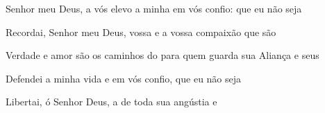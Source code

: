 \begin{greenumerate}
  \item {}Senhor meu Deus, a vós elevo a minha  em vós confio: que eu não seja 

  \item {}Recordai, Senhor meu Deus, vossa  e a vossa compaixão que são 

  \item {}Verdade e amor são os caminhos do  para quem guarda sua Aliança e seus 

  \item {}Defendei a minha vida e  em vós confio, que eu não seja 

  \item {}Libertai, ó Senhor Deus, a  de toda sua angústia e 
\end{greenumerate}